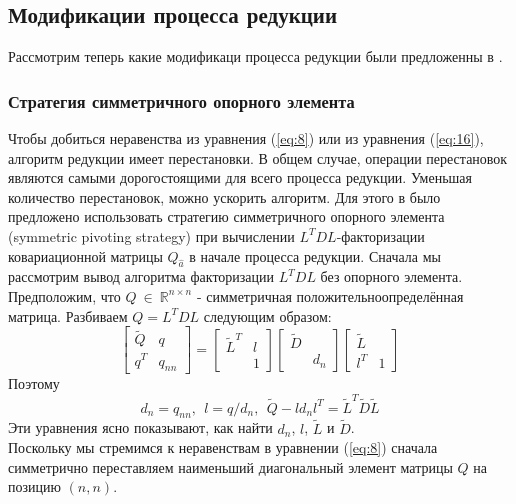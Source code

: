 \documentclass[12pt]{matmex-diploma}
\begin{document}
\subsection{Модификации процесса редукции}
Рассмотрим теперь какие модификаци процесса редукции были предложенны в \cite{article:mlambda}.
\subsubsection{Стратегия симметричного опорного элемента}
Чтобы добиться неравенства из уравнения (\ref{eq:8}) или из уравнения (\ref{eq:16}),
алгоритм редукции имеет перестановки. В общем случае,
операции перестановок являются самыми дорогостоящими для всего процесса
редукции. Уменьшая количество перестановок, можно ускорить алгоритм.
Для этого в \cite{article:mlambda} было предложено использовать стратегию
симметричного опорного элемента (symmetric pivoting strategy) при вычислении
$L^T D L$-факторизации ковариационной матрицы $Q_{\hat{a}}$  в начале процесса
редукции. Сначала мы рассмотрим вывод алгоритма факторизации $L^T D L$ без опорного
элемента. Предположим, что $Q \ \in \ \mathbb{R}^{n \times n}$ - симметричная
положительноопределённая матрица. Разбиваем $Q = L^T D L$ следующим образом:
\begin{equation*}
     \begin{bmatrix}
     \tilde{Q} & q \\
     q^T & q_{nn}
     \end{bmatrix} = 
     \begin{bmatrix}
     \tilde{L}^{T} & l  \\
     & 1
     \end{bmatrix}
     \begin{bmatrix}
     \tilde{D} &   \\
     & d_n
     \end{bmatrix}
     \begin{bmatrix}
     \tilde{L} &   \\
     l^T & 1
     \end{bmatrix}
\end{equation*}
Поэтому
\begin{equation*}
     d_n = q_{nn}, \ \ l = q/d_n, \ \ \tilde{Q} - ld_nl^T = \tilde{L}^T\tilde{D}\tilde{L}
\end{equation*}
Эти уравнения ясно показывают, как найти $d_n$, $l$, $\tilde{L}$ и $\tilde{D}$. \\
Поскольку мы стремимся к неравенствам в уравнении (\ref{eq:8}) сначала симметрично
переставляем наименьший диагональный элемент матрицы $Q$ на позицию $(n, n)$.
\end{document}
